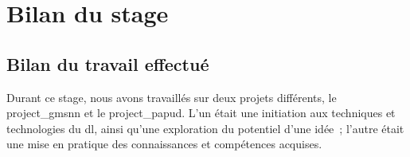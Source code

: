 






\chapter{Bilan du stage}
\section{Bilan du travail effectué}
Durant ce stage, nous avons travaillés sur deux projets différents, le \gls{project_gmsnn} et le \gls{project_papud}.
L'un était une initiation aux techniques et technologies du \gls{dl}, ainsi qu'une exploration du potentiel d'une idée~; l'autre était une mise en pratique des connaissances et compétences acquises.

